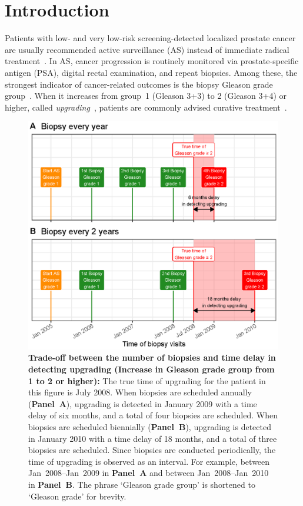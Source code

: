 \section{Introduction}
Patients with low- and very low-risk screening-detected localized prostate cancer are usually recommended active surveillance (AS) instead of immediate radical treatment~\citep{briganti2018active}. In AS, cancer progression is routinely monitored via prostate-specific antigen (PSA), digital rectal examination, and repeat biopsies. Among these, the strongest indicator of cancer-related outcomes is the biopsy Gleason grade group~\citep{epsteinGG2014}. When it increases from group~1 (Gleason 3+3) to 2 (Gleason 3+4) or higher, called \textit{upgrading}~\citep{bruinsma2017expert}, patients are commonly advised curative treatment~\citep{bul2013active}.

\begin{figure}
\centerline{\includegraphics[width=\columnwidth]{images/delay_explanation.eps}}
\caption{\textbf{Trade-off between the number of biopsies and time delay in detecting upgrading (Increase in Gleason grade group from 1 to 2 or higher):} The true time of upgrading for the patient in this figure is July 2008. When biopsies are scheduled annually (\textbf{Panel~A}), upgrading is detected in January 2009 with a time delay of six months, and a total of four biopsies are scheduled. When biopsies are scheduled biennially (\textbf{Panel~B}), upgrading is detected in January 2010 with a time delay of 18 months, and a total of three biopsies are scheduled. Since biopsies are conducted periodically, the time of upgrading is observed as an interval. For example, between Jan~2008--Jan~2009 in \textbf{Panel~A} and between Jan~2008--Jan~2010 in \textbf{Panel~B}. The phrase `Gleason grade group' is shortened to `Gleason grade' for brevity.}
\label{fig:delay_explanation}
\end{figure}

